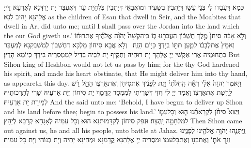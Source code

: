 {כְּמָא דַּעֲבַדוּ לִי בְּנֵי עֵשָׂו דְּיָתְבִין בְּשֵׂעִיר וּמוֹאֲבָאֵי דְּיָתְבִין בִּלְחָיַת עַד דְּאֶעְבַּר יָת יַרְדְּנָא לְאַרְעָא דַּייָ אֱלָהַנָא יָהֵיב לַנָא׃}
{as the children of Esau that dwell in Seir, and the Moabites that dwell in Ar, did unto me; until I shall pass over the Jordan into the land which the \lord\space our God giveth us.’}{}
{וְלֹ֣א אָבָ֗ה סִיחֹן֙ מֶ֣לֶךְ חֶשְׁבּ֔וֹן הַעֲבִרֵ֖נוּ בּ֑וֹ כִּֽי\maqqaf הִקְשָׁה֩ יְהֹוָ֨ה אֱלֹהֶ֜יךָ אֶת\maqqaf רוּח֗וֹ וְאִמֵּץ֙ אֶת\maqqaf לְבָב֔וֹ לְמַ֛עַן תִּתּ֥וֹ בְיָדְךָ֖ כַּיּ֥וֹם הַזֶּֽה׃ \setuma }
{וְלָא אֲבָא סִיחוֹן מַלְכָּא דְּחֶשְׁבּוֹן לְמִשְׁבְּקַנָא לְמִעְבַּר בִּתְחוּמֵיהּ אֲרֵי אַקְשִׁי יְיָ אֱלָהָךְ יָת רוּחֵיהּ וְתַקֵּיף יָת לִבֵּיהּ בְּדִיל לְמִמְסְרֵיהּ בִּידָךְ כְּיוֹמָא הָדֵין׃}
{But Sihon king of Heshbon would not let us pass by him; for the \lord\space thy God hardened his spirit, and made his heart obstinate, that He might deliver him into thy hand, as appeareth this day.}{}
{וַיֹּ֤אמֶר יְהֹוָה֙ אֵלַ֔י רְאֵ֗ה הַֽחִלֹּ֙תִי֙ תֵּ֣ת לְפָנֶ֔יךָ אֶת\maqqaf סִיחֹ֖ן וְאֶת\maqqaf אַרְצ֑וֹ הָחֵ֣ל רָ֔שׁ לָרֶ֖שֶׁת אֶת\maqqaf אַרְצֽוֹ׃}
{וַאֲמַר יְיָ לִי חֲזִי דְּשָׁרִיתִי לְמִמְסַר קֳדָמָךְ יָת סִיחוֹן וְיָת אַרְעֵיהּ שָׁרִי לְתָרָכוּתֵיהּ לְמֵירַת יָת אַרְעֵיהּ׃}
{And the \lord\space said unto me: ‘Behold, I have begun to deliver up Sihon and his land before thee; begin to possess his land.’}{}
{וַיֵּצֵא֩ סִיחֹ֨ן לִקְרָאתֵ֜נוּ ה֧וּא וְכׇל\maqqaf עַמּ֛וֹ לַמִּלְחָמָ֖ה יָֽהְצָה׃}
{וּנְפַק סִיחוֹן לְקַדָּמוּתַנָא הוּא וְכָל עַמֵּיהּ לְאָגָחָא קְרָבָא לְיָהָץ׃}
{Then Sihon came out against us, he and all his people, unto battle at Jahaz.}{}
{וַֽיִּתְּנֵ֛הוּ יְהֹוָ֥ה אֱלֹהֵ֖ינוּ לְפָנֵ֑ינוּ וַנַּ֥ךְ אֹת֛וֹ וְאֶת\maqqaf בָּנָ֖ו וְאֶת\maqqaf כׇּל\maqqaf עַמּֽוֹ׃}
{וּמַסְרֵיהּ יְיָ אֱלָהַנָא קֳדָמַנָא וּמְחֵינָא יָתֵיהּ וְיָת בְּנוֹהִי וְיָת כָּל עַמֵּיהּ׃}
